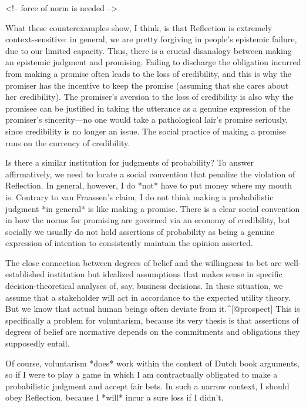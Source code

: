 \textless{}!-- force of norm is needed --\textgreater{}

What these counterexamples show, I think, is that Reflection is
extremely context-sensitive: in general, we are pretty forgiving in
people's epistemic failure, due to our limited capacity. Thus, there is
a crucial disanalogy between making an epistemic judgment and promising.
Failing to discharge the obligation incurred from making a promise often
leads to the loss of credibility, and this is why the promiser has the
incentive to keep the promise (assuming that she cares about her
credibility). The promiser's aversion to the loss of credibility is also
why the promisee can be justified in taking the utterance as a genuine
expression of the promiser's sincerity---no one would take a
pathological lair's promise seriously, since credibility is no longer an
issue. The social practice of making a promise runs on the currency of
credibility.

Is there a similar institution for judgments of probability? To answer
affirmatively, we need to locate a social convention that penalize the
violation of Reflection. In general, however, I do *not* have to put
money where my mouth is. Contrary to van Fraassen's claim, I do not
think making a probabilistic judgment *in general* is like making a
promise. There is a clear social convention in how the norms for
promising are governed via an economy of credibility, but socially we
usually do not hold assertions of probability as being a genuine
expression of intention to consistently maintain the opinion asserted.

The close connection between degrees of belief and the willingness to
bet are well-established institution but idealized assumptions that
makes sense in specific decision-theoretical analyses of, say, business
decisions. In these situation, we assume that a stakeholder will act in
accordance to the expected utility theory. But we know that actual human
beings often deviate from it.\^{}{[}@prospect{]} This is specifically a
problem for voluntarism, because its very thesis is that assertions of
degrees of belief are normative depends on the commitments and
obligations they supposedly entail.

Of course, voluntarism *does* work within the context of Dutch book
arguments, so if I were to play a game in which I am contractually
obligated to make a probabilistic judgment and accept fair bets. In such
a narrow context, I should obey Reflection, because I *will* incur a
sure loss if I didn't.

